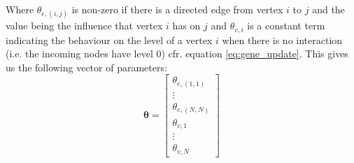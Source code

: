 Where $\theta_{e,(i,j)}$ is non-zero if there is a directed edge from vertex $i$ to $j$ and the value being the influence that vertex $i$ has on $j$ and $\theta_{v,i}$ is a constant term indicating the behaviour on the level of a vertex $i$ 
when there is no interaction (i.e. the incoming nodes have level 0) cfr. equation \ref{eq:gene_update}. This gives us the following vector of parameters:
\begin{equation}
 \mathbf{\theta} = \begin{bmatrix}
                     \theta_{e,(1,1)} \\
                     \vdots \\
                     \theta_{e,(N,N)} \\
                     \theta_{v,1} \\
                     \vdots \\
                     \theta_{v,N}
                    \end{bmatrix}
% 
\end{equation}
